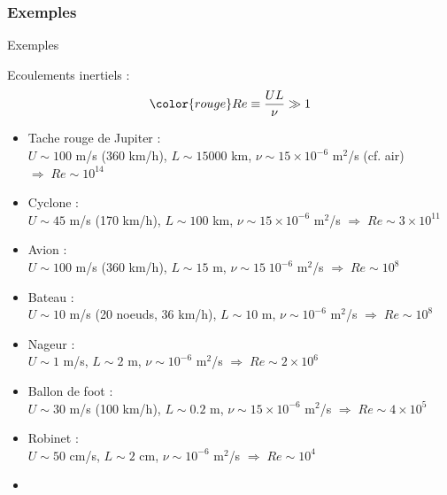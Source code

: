 \subsubsection{Exemples}
\begin{frame}{Exemples}

\small

Ecoulements inertiels :
\[
  \color{rouge}
  Re \equiv \frac{UL}{\nu} \gg 1
\]

\pause

\begin{itemize}[<+-| alert@+>]
\item
	Tache rouge de Jupiter : \\
	$U\sim 100$ m/s (360 km/h), $L \sim 15 000$ km, $\nu \sim 15\times 10^{-6}$ m$^2$/s (cf. air) 
	$\Rightarrow \; Re\sim 10^{14}$
\item
	Cyclone : \\
	$U\sim 45$ m/s (170 km/h), $L \sim 100$ km, $\nu \sim 15\times 10^{-6}$ m$^2$/s 
	$\Rightarrow \; Re\sim 3\times 10^{11}$
\item
	Avion : \\
	$U\sim 100$ m/s (360 km/h), $L \sim 15$ m, $\nu \sim 15\; 10^{-6}$ m$^2$/s 
 	$\Rightarrow \; Re\sim 10^{8}$
\item
	Bateau : \\
	$U\sim 10$ m/s (20 noeuds, 36 km/h), $L \sim 10$ m, $\nu \sim 10^{-6}$ m$^2$/s 
	$\Rightarrow \; Re\sim 10^{8}$
\item
	Nageur : \\
	$U\sim 1$ m/s, $L \sim 2$ m, $\nu \sim 10^{-6}$ m$^2$/s 
	$\Rightarrow \; Re\sim 2\times 10^{6}$
\item
	Ballon de foot : \\
	$U\sim 30$ m/s (100 km/h), $L \sim 0.2$ m, $\nu \sim 15 \times 10^{-6}$ m$^2$/s 
	$\Rightarrow \; Re\sim 4\times 10^{5}$
\item
	Robinet : \\
	$U\sim 50$ cm/s, $L \sim 2$ cm, $\nu \sim 10^{-6}$ m$^2$/s 
	$\Rightarrow \; Re\sim 10^4$
\item[]
\end{itemize}


\vspace{5mm}

\end{frame}

